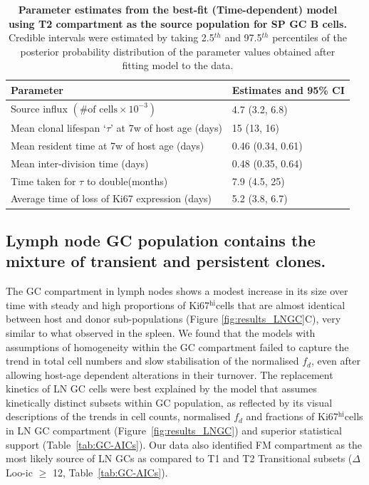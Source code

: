 \documentclass[11pt]{article}
\newcommand{\khi}{Ki67$^\text{hi}$}
\begin{document}
\begin{table}[h!]
\begin{center}
		\renewcommand{\arraystretch}{1.25}
		\begin{tabular}{l l }
			\toprule
			\textbf{Parameter}                                & \textbf{Estimates and 95\% CI} \\
			\toprule
			Source influx $(\# \text{of cells} \times 10^{-3})$      & 4.7 (3.2, 6.8)       \\
			Mean clonal lifespan `$\tau$' at 7w of host age (days)   & 15 (13, 16)           \\
			Mean resident time at 7w of host age  (days)             & 0.46 (0.34, 0.61)     \\			
			Mean inter-division time (days)                          & 0.48 (0.35, 0.64)     \\
			Time taken for $\tau$ to double(months)                  & 7.9 (4.5, 25)        \\
			Average time of loss of Ki67 expression (days)           & 5.2 (3.8, 6.7)  \\					
			\hline
			\toprule 
		\end{tabular}
	\end{center}
	\caption{\small \textbf{Parameter estimates from the best-fit (Time-dependent) model using T2 compartment as the source population for SP GC B cells.}  Credible intervals were estimated by taking 2.5$^{th}$ and 97.5$^{th}$ percentiles of the posterior probability distribution of the parameter values obtained after fitting model to the data.}
	\label{tab:SPGC-parestm}
\end{table} 
	
\subsection*{Lymph node GC population contains the mixture of transient and persistent clones.}
The GC compartment in lymph nodes shows a modest increase in its size over time with steady and high proportions of \khi cells that are almost identical between host and donor sub-populations (Figure \ref{fig:results_LNGC}C), very similar to what observed in the spleen.
We found that the models with assumptions of homogeneity within the GC compartment failed to capture the trend in total cell numbers and slow stabilisation of the normalised $f_{d}$, even after allowing host-age dependent alterations in their turnover. 
The replacement kinetics of LN GC cells were best explained by the model that assumes kinetically distinct subsets within GC population, as reflected by its visual descriptions of the trends in cell counts, normalised $f_{d}$ and fractions of \khi cells in LN GC compartment (Figure~\ref{fig:results_LNGC}) and superior statistical support (Table~\ref{tab:GC-AICs}). 
Our data also identified FM compartment as the most likely source of LN GCs as compared to T1 and T2 Transitional subsets ($\Delta$Loo-ic $\ge$ 12, Table~\ref{tab:GC-AICs}).
\end{document}
